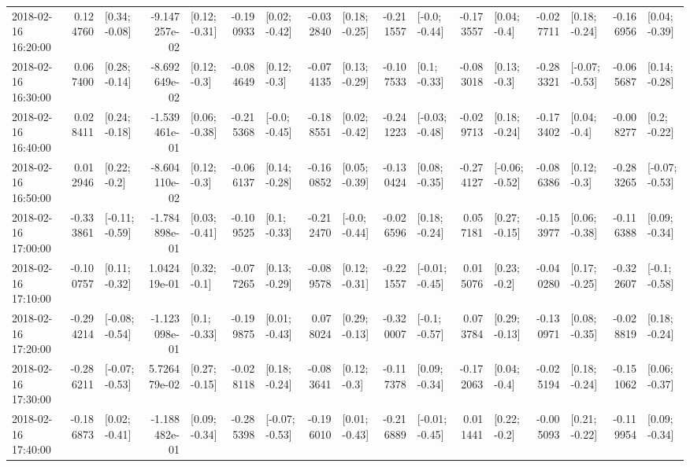 \begin{tabular}{lrlrlrlrlrlrlrlrl}
2018-02-16 16:20:00 &  0.124760 &   [0.34; -0.08] & -9.147257e-02 &   [0.12; -0.31] & -0.190933 &   [0.02; -0.42] & -0.032840 &   [0.18; -0.25] & -0.211557 &   [-0.0; -0.44] & -0.173557 &    [0.04; -0.4] & -0.027711 &   [0.18; -0.24] & -0.166956 &   [0.04; -0.39] \\
2018-02-16 16:30:00 &  0.067400 &   [0.28; -0.14] & -8.692649e-02 &    [0.12; -0.3] & -0.084649 &    [0.12; -0.3] & -0.074135 &   [0.13; -0.29] & -0.107533 &    [0.1; -0.33] & -0.083018 &    [0.13; -0.3] & -0.283321 &  [-0.07; -0.53] & -0.065687 &   [0.14; -0.28] \\
2018-02-16 16:40:00 &  0.028411 &   [0.24; -0.18] & -1.539461e-01 &   [0.06; -0.38] & -0.215368 &   [-0.0; -0.45] & -0.188551 &   [0.02; -0.42] & -0.241223 &  [-0.03; -0.48] & -0.029713 &   [0.18; -0.24] & -0.173402 &    [0.04; -0.4] & -0.008277 &    [0.2; -0.22] \\
2018-02-16 16:50:00 &  0.012946 &    [0.22; -0.2] & -8.604110e-02 &    [0.12; -0.3] & -0.066137 &   [0.14; -0.28] & -0.160852 &   [0.05; -0.39] & -0.130424 &   [0.08; -0.35] & -0.274127 &  [-0.06; -0.52] & -0.086386 &    [0.12; -0.3] & -0.283265 &  [-0.07; -0.53] \\
2018-02-16 17:00:00 & -0.333861 &  [-0.11; -0.59] & -1.784898e-01 &   [0.03; -0.41] & -0.109525 &    [0.1; -0.33] & -0.212470 &   [-0.0; -0.44] & -0.026596 &   [0.18; -0.24] &  0.057181 &   [0.27; -0.15] & -0.153977 &   [0.06; -0.38] & -0.116388 &   [0.09; -0.34] \\
2018-02-16 17:10:00 & -0.100757 &   [0.11; -0.32] &  1.042419e-01 &    [0.32; -0.1] & -0.077265 &   [0.13; -0.29] & -0.089578 &   [0.12; -0.31] & -0.221557 &  [-0.01; -0.45] &  0.015076 &    [0.23; -0.2] & -0.040280 &   [0.17; -0.25] & -0.322607 &   [-0.1; -0.58] \\
2018-02-16 17:20:00 & -0.294214 &  [-0.08; -0.54] & -1.123098e-01 &    [0.1; -0.33] & -0.199875 &   [0.01; -0.43] &  0.078024 &   [0.29; -0.13] & -0.320007 &   [-0.1; -0.57] &  0.073784 &   [0.29; -0.13] & -0.130971 &   [0.08; -0.35] & -0.028819 &   [0.18; -0.24] \\
2018-02-16 17:30:00 & -0.286211 &  [-0.07; -0.53] &  5.726479e-02 &   [0.27; -0.15] & -0.028118 &   [0.18; -0.24] & -0.083641 &    [0.12; -0.3] & -0.117378 &   [0.09; -0.34] & -0.172063 &    [0.04; -0.4] & -0.025194 &   [0.18; -0.24] & -0.151062 &   [0.06; -0.37] \\
2018-02-16 17:40:00 & -0.186873 &   [0.02; -0.41] & -1.188482e-01 &   [0.09; -0.34] & -0.285398 &  [-0.07; -0.53] & -0.196010 &   [0.01; -0.43] & -0.216889 &  [-0.01; -0.45] &  0.011441 &    [0.22; -0.2] & -0.005093 &   [0.21; -0.22] & -0.119954 &   [0.09; -0.34] \\

\end{tabular}
